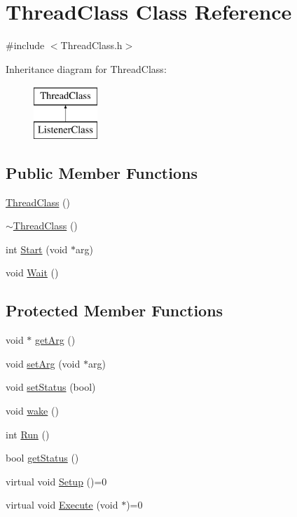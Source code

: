 \hypertarget{classThreadClass}{\section{\-Thread\-Class \-Class \-Reference}
\label{classThreadClass}
}


{\ttfamily \#include $<$\-Thread\-Class.\-h$>$}

\-Inheritance diagram for \-Thread\-Class\-:\begin{figure}[H]
\begin{center}
\leavevmode
\includegraphics[height=2.000000cm]{classThreadClass}
\end{center}
\end{figure}
\subsection*{\-Public \-Member \-Functions}
\begin{DoxyCompactItemize}
\item 
\hyperlink{classThreadClass_ac19d9b2f09e438d5068342bd02ff5661}{\-Thread\-Class} ()
\item 
\hyperlink{classThreadClass_a61dc219271efbbb059e5d78fd2a4e0ac}{$\sim$\-Thread\-Class} ()
\item 
int \hyperlink{classThreadClass_a6e0e65009911bab842025725b87a48a0}{\-Start} (void $\ast$arg)
\item 
void \hyperlink{classThreadClass_a199c95085d110a47c5a83da0529d90f2}{\-Wait} ()
\end{DoxyCompactItemize}
\subsection*{\-Protected \-Member \-Functions}
\begin{DoxyCompactItemize}
\item 
void $\ast$ \hyperlink{classThreadClass_a06fd94929154dbcb74adfb5fe4c430d3}{get\-Arg} ()
\item 
void \hyperlink{classThreadClass_ac5077b7e70c5634bd82e2739f9d486bd}{set\-Arg} (void $\ast$arg)
\item 
void \hyperlink{classThreadClass_af8d3455f41b943c445c4894fbec9a9a7}{set\-Status} (bool)
\item 
void \hyperlink{classThreadClass_aa3a152dd553c2dd4326eeafc13b3e562}{wake} ()
\item 
int \hyperlink{classThreadClass_ab9fc65d8931c6de24bb8d7659397a491}{\-Run} ()
\item 
bool \hyperlink{classThreadClass_a039630a7228034cd111fe5d461a5e9fe}{get\-Status} ()
\item 
virtual void \hyperlink{classThreadClass_a79775d1799a12bf4c9575cad8fd462d0}{\-Setup} ()=0
\item 
virtual void \hyperlink{classThreadClass_aa6b3fb3567bd8b7d67b4aa200cd47e00}{\-Execute} (void $\ast$)=0
\end{DoxyCompactItemize}
